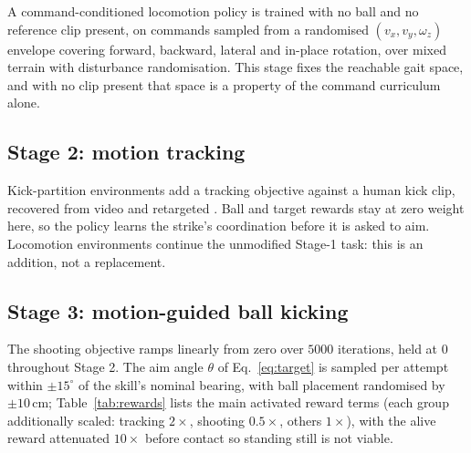 \documentclass[letterpaper, 10 pt, conference]{ieeeconf}  %
\begin{document}
A command-conditioned locomotion policy is trained with no ball and no reference
clip present, on commands sampled from a randomised $(v_x, v_y, \omega_z)$
envelope covering forward, backward, lateral and in-place rotation, over mixed
terrain with disturbance randomisation. This stage fixes the reachable gait
space, and with no clip present that space is a property of the command
curriculum alone.

\subsection{Stage 2: motion tracking}

Kick-partition environments add a tracking objective against a human kick clip,
recovered from video \cite{gvhmr} and retargeted \cite{gmr}. Ball and target
rewards stay at zero weight here, so the policy learns the strike's
coordination before it is asked to aim. Locomotion environments continue the
unmodified Stage-1 task: this is an addition, not a replacement.

\subsection{Stage 3: motion-guided ball kicking}
\label{sec:stage3}

The shooting objective ramps linearly from zero over $5000$ iterations, held
at $0$ throughout Stage 2. The aim angle $\theta$ of Eq.~\ref{eq:target} is
sampled per attempt within $\pm15^\circ$ of the skill's nominal bearing, with
ball placement randomised by $\pm10$\,cm; Table~\ref{tab:rewards} lists the main
activated reward terms (each group additionally scaled: tracking $2\times$,
shooting $0.5\times$, others $1\times$), with the alive reward attenuated
$10\times$ before contact so standing still is not viable.
\end{document}
